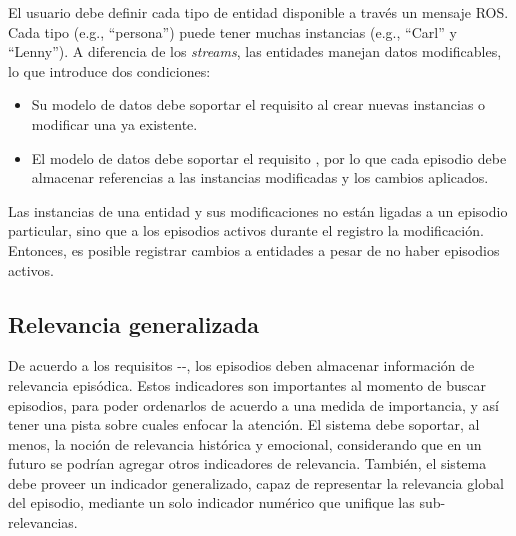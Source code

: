 El usuario debe definir cada tipo de entidad disponible a través un mensaje ROS. Cada tipo (e.g., ``persona'') puede tener muchas instancias (e.g., ``Carl'' y ``Lenny''). A diferencia de los \textit{streams}, las entidades manejan datos modificables, lo que introduce dos condiciones:
\begin{itemize}
\item Su modelo de datos debe soportar el requisito  al crear nuevas instancias o modificar una ya existente.
\item El modelo de datos debe soportar el requisito , por lo que cada episodio debe almacenar referencias a las instancias modificadas y los cambios aplicados.
\end{itemize}

Las instancias de una entidad y sus modificaciones no están ligadas a un episodio particular, sino que a los episodios activos durante el registro la modificación. Entonces, es posible registrar cambios a entidades a pesar de no haber episodios activos.


\subsection{Relevancia generalizada}

De acuerdo a los requisitos --, los episodios deben almacenar información de relevancia episódica. Estos indicadores son importantes al momento de buscar episodios, para poder ordenarlos de acuerdo a una medida de importancia, y así tener una pista sobre cuales enfocar la atención. El sistema debe soportar, al menos, la noción de relevancia histórica y emocional, considerando que en un futuro se podrían agregar otros indicadores de relevancia. También, el sistema debe proveer un indicador generalizado, capaz de representar la relevancia global del episodio, mediante un solo indicador numérico que unifique las sub-relevancias.

